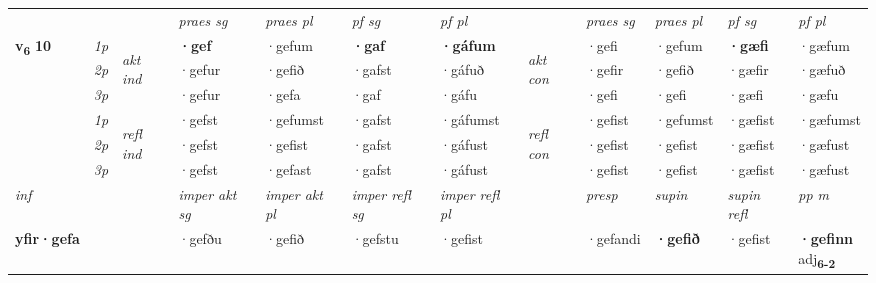 \begin{longtable}[l]{X>{\footnotesize\itshape}llXXXXlXXXX}
 & &   & \textit{praes sg}  & \textit{praes pl}    & \textit{ pf sg} & \textit{pf pl} & & \textit{praes sg}  & \textit{praes pl}    & \textit{pf sg} & \textit{pf pl }  \\ \cmidrule{4-7} \cmidrule{9-12}
 \multirow{2}{*}{{{\textbf{v{\textsubscript{6}}} \Large{\textbf{10}}}}}  & 1p & \multirow{3}{*}{\begin{turn}{90}\textit{akt ind}\end{turn}} & \textbf{·gef} & ·gefum & \textbf{·gaf} & \textbf{·gáfum} & \multirow{3}{*}{\begin{turn}{90}\textit{akt con}\end{turn}} &·gefi & ·gefum & \textbf{·gæfi} & ·gæfum\\*
 & 2p &  &  ·gefur  & ·gefið & ·gafst & ·gáfuð & & ·gefir & ·gefið & ·gæfir & ·gæfuð \\*
 & 3p &  & ·gefur & ·gefa & ·gaf & ·gáfu & & ·gefi & ·gefi& ·gæfi & ·gæfu \\*
\cmidrule{4-7} \cmidrule{9-12}
 & 1p & \multirow{3}{*}{\begin{turn}{90}\textit{refl ind}\end{turn}}  & ·gefst & ·gefumst & ·gafst & ·gáfumst & \multirow{3}{*}{\begin{turn}{90}\textit{refl con}\end{turn}}  &·gefist & ·gefumst & ·gæfist & ·gæfumst \\*
 & 2p &  & ·gefst & ·gefist & ·gafst & ·gáfust & &·gefist & ·gefist & ·gæfist & ·gæfust \\*
 & 3p  & & ·gefst & ·gefast & ·gafst & ·gáfust & & ·gefist & ·gefist& ·gæfist & ·gæfust \\*
\cmidrule{4-7} \cmidrule{9-12}

   {\textit{inf}} & &  & \textit{imper akt sg} & \textit{imper akt pl} & \textit{imper refl sg} & \textit{imper refl pl} && \textit{presp} & \textit{supin} & \textit{supin refl} & \textit{pp m} \\*
  {\textbf{yfir\allowbreak ·gefa}} & && ·gefðu  & ·gefið & ·gefstu & ·gefist && ·gefandi &  \textbf{·gefið} & ·gefist & \specialcell{\textbf{·gefinn} \\ adj\textbf{\textsubscript{6-2}}} \\*

\midrule


\end{longtable}
